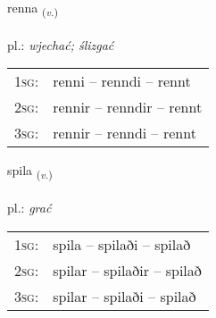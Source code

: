 \documentclass[frontgrid, backgrid]{flacards}\usepackage[]{graphicx}\usepackage[]{xcolor}
\begin{document}
\renewcommand{\flhead}{\vskip5pt \fboxsep=0pt {\small\bfseries\footnotesize Sagnorð | Verb}}
\renewcommand{\fcfoot}{\vskip5pt \fboxsep=0pt \hspace{2pt}{\small\bfseries\footnotesize 1K}}

\renewcommand{\blhead}{\vskip5pt {\small\bfseries\footnotesize Sagnorð | Verb }}
\renewcommand{\bcfoot}{\vskip5pt \hspace{2pt}{\small\bfseries\footnotesize 1K}}


{renna \small{\textsubscript{(\textit{v.})}} \\[1ex] %
\textphonetic{[rɛna]} \\
pl.: \emph{wjechać; ślizgać} \\  [2ex]
\renewcommand*{\arraystretch}{0.8}
\begin{tabular}{p{1cm}l}
\textsc{1sg}: & renni -- renndi -- rennt \\ 
\textsc{2sg}: & rennir -- renndir -- rennt \\ 
\textsc{3sg}: & rennir -- renndi -- rennt \\ 
\end{tabular}
}

\renewcommand{\flhead}{\vskip5pt \fboxsep=0pt {\small\bfseries\footnotesize Sagnorð | Verb}}
\renewcommand{\fcfoot}{\vskip5pt \fboxsep=0pt \hspace{2pt}{\small\bfseries\footnotesize 1K}}

\renewcommand{\blhead}{\vskip5pt {\small\bfseries\footnotesize Sagnorð | Verb }}
\renewcommand{\bcfoot}{\vskip5pt \hspace{2pt}{\small\bfseries\footnotesize 1K}}


{spila \small{\textsubscript{(\textit{v.})}} \\[1ex] %
\textphonetic{[spɪːla]} \\
pl.: \emph{grać} \\  [2ex]
\renewcommand*{\arraystretch}{0.8}
\begin{tabular}{p{1cm}l}
\textsc{1sg}: & spila -- spilaði -- spilað \\ 
\textsc{2sg}: & spilar -- spilaðir -- spilað \\ 
\textsc{3sg}: & spilar -- spilaði -- spilað \\ 
\end{tabular}
}
\end{document}
